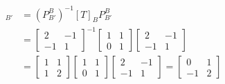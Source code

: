 \begin{solution}
\begin{align*}
[T]_{B'} &= (P_{B'}^B)^{-1} [T]_B P_{B'}^B \\
&= 
\begin{bmatrix}
2 & -1 \\
-1 & 1
\end{bmatrix}^{-1}
\begin{bmatrix}
1 & 1 \\
0 & 1
\end{bmatrix}
\begin{bmatrix}
2 & -1 \\
-1 & 1
\end{bmatrix} \\
&= 
\begin{bmatrix}
1 & 1 \\
1 & 2
\end{bmatrix}
\begin{bmatrix}
1 & 1 \\
0 & 1
\end{bmatrix}
\begin{bmatrix}
2 & -1 \\
-1 & 1
\end{bmatrix}
=
\begin{bmatrix}
0 & 1\\
-1 & 2
\end{bmatrix}
\end{align*}
\end{solution}


